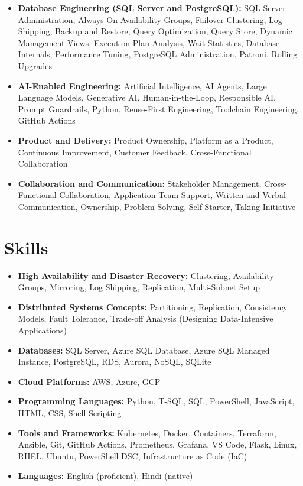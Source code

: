 \documentclass[10pt,a4paper]{article}
\begin{document}
\begin{itemize}
  \item \textbf{Database Engineering (SQL Server and PostgreSQL):} SQL Server Administration, Always On Availability Groups, Failover Clustering, Log Shipping, Backup and Restore, Query Optimization, Query Store, Dynamic Management Views, Execution Plan Analysis, Wait Statistics, Database Internals, Performance Tuning, PostgreSQL Administration, Patroni, Rolling Upgrades
  \item \textbf{AI-Enabled Engineering:} Artificial Intelligence, AI Agents, Large Language Models, Generative AI, Human-in-the-Loop, Responsible AI, Prompt Guardrails, Python, Reuse-First Engineering, Toolchain Engineering, GitHub Actions
  \item \textbf{Product and Delivery:} Product Ownership, Platform as a Product, Continuous Improvement, Customer Feedback, Cross-Functional Collaboration
  \item \textbf{Collaboration and Communication:} Stakeholder Management, Cross-Functional Collaboration, Application Team Support, Written and Verbal Communication, Ownership, Problem Solving, Self-Starter, Taking Initiative
\end{itemize}

\section{Skills}
\begin{itemize}
  \item \textbf{High Availability and Disaster Recovery:} Clustering, Availability Groups, Mirroring, Log Shipping, Replication, Multi-Subnet Setup
  \item \textbf{Distributed Systems Concepts:} Partitioning, Replication, Consistency Models, Fault Tolerance, Trade-off Analysis (Designing Data-Intensive Applications)
  \item \textbf{Databases:} SQL Server, Azure SQL Database, Azure SQL Managed Instance, PostgreSQL, RDS, Aurora, NoSQL, SQLite
  \item \textbf{Cloud Platforms:} AWS, Azure, GCP
  \item \textbf{Programming Languages:} Python, T-SQL, SQL, PowerShell, JavaScript, HTML, CSS, Shell Scripting
  \item \textbf{Tools and Frameworks:} Kubernetes, Docker, Containers, Terraform, Ansible, Git, GitHub Actions, Prometheus, Grafana, VS Code, Flask, Linux, RHEL, Ubuntu, PowerShell DSC, Infrastructure as Code (IaC)
  \item \textbf{Languages:} English (proficient), Hindi (native)
\end{itemize}
\end{document}
